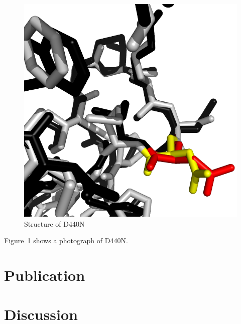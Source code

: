 \documentclass[11pt, titlepage, a4paper, oneside, onecolumn]{scrbook} %
\begin{document}
\begin{figure}[b]
  \centering
    \includegraphics[scale=0.2]{test}
  \caption{Structure of D440N}
  \label{fig:D440N}
\end{figure}
Figure~\ref{fig:D440N} shows a photograph of D440N.



\part{Publication}

\part{Discussion}





\end{document}
